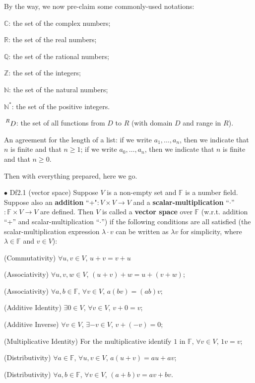 \documentclass{article}
\begin{document}
By the way, we now pre-claim some commonly-used notations:
\begin{compactenum}
    \item $\mathbb{C}$: the set of the complex numbers;
    \item $\mathbb{R}$: the set of the real numbers;
    \item $\mathbb{Q}$: the set of the rational numbers;
    \item $\mathbb{Z}$: the set of the integers;
    \item $\mathbb{N}$: the set of the natural numbers;
    \item $\mathbb{N^\ast}$: the set of the positive integers.
    \item $\sideset{^R}{}{\mathop{D}}$: the set of all functions from $D$ to $R$ (with domain $D$ and range in $R$).
    \item An agreement for the length of a list: if we write $a_1, \dots, a_n$, then we indicate that $n$ is finite and that $n\geq 1$; if we write $a_0, \dots, a_n$, then we indicate that $n$ is finite and that $n\geq 0$.
\end{compactenum} 
Then with everything prepared, here we go.

\begin{Df}{$\bullet$ Df2.1 (vector space)}
    Suppose $V$ is a non-empty set and $\mathbb{F}$ is a number field. Suppose also an \textbf{addition} ``+"$: V\times V\rightarrow V$ and a \textbf{scalar-multiplication} ``$\cdot$''$: \mathbb{F}\times V\rightarrow V$ are defined. Then $V$ is called a \textbf{vector space} over $\mathbb{F}$ (w.r.t. addition ``+'' and scalar-multiplication ``$\cdot$'') if the following conditions are all satisfied (the scalar-multiplication expression $\lambda\cdot v$ can be written as $\lambda v$ for simplicity, where $\lambda\in\mathbb{F}$ and $v\in V$):
    \begin{compactenum}
        \item (Commutativity) $\forall u,v\in V$, $u+v=v+u$
        \item (Associativity) $\forall u,v,w\in V$, $(u+v)+w=u+(v+w)$;
        \item (Associativity) $\forall a,b\in\mathbb{F}$, $\forall v\in V$, $a(bv)=(ab)v$;
        \item (Additive Identity) $\exists 0\in V$, $\forall v\in V$, $v+0=v$;
        \item (Additive Inverse) $\forall v\in V$, $\exists -v\in V$, $v+(-v)=0$;
        \item (Multiplicative Identity) For the multiplicative identify $1$ in $\mathbb{F}$, $\forall v\in V$, $1v=v$;
        \item (Distributivity) $\forall a\in\mathbb{F}$, $\forall u,v\in V$, $a(u+v)=au+av$;
        \item (Distributivity) $\forall a,b\in\mathbb{F}$, $\forall v\in V$, $(a+b)v=av+bv$.
    \end{compactenum}
\end{Df}
\end{document}
